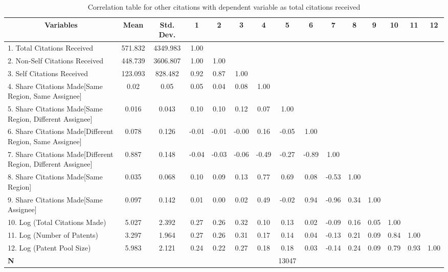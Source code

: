 \begin{table}[htbp]\centering \caption{Correlation table for other citations with dependent variable as total citations received \label{o.tcorrelation}}
\scriptsize
\onehalfspacing
\begin{adjustbox}{angle=90}
\begin{tabular}{l  c  c  c  c  c  c  c  c  c  c  c  c  c  c }\hline\hline
\multicolumn{1}{c}{Variables} & \textbf{Mean}& \textbf{Std. Dev.}&1&2&3&4&5&6&7&8&9&10&11&12\\ \hline
1. Total Citations Received& 571.832 & 4349.983&1.00\\
2. Non-Self Citations Received& 448.739 & 3606.807&1.00&1.00\\
3. Self Citations Received & 123.093 & 828.482&0.92&0.87&1.00\\
4. Share Citations Made[Same Region, Same Assignee] & 0.02 & 0.05&0.05&0.04&0.08&1.00\\
5. Share Citations Made[Same Region, Different Assignee]& 0.016 & 0.043&0.10&0.10&0.12&0.07&1.00\\
6. Share Citations Made[Different Region, Same Assignee]& 0.078 & 0.126&-0.01&-0.01&-0.00&0.16&-0.05&1.00\\
7. Share Citations Made[Different Region, Different Assignee]& 0.887 & 0.148&-0.04&-0.03&-0.06&-0.49&-0.27&-0.89&1.00\\
8. Share Citations Made[Same Region] & 0.035 & 0.068&0.10&0.09&0.13&0.77&0.69&0.08&-0.53&1.00\\
9. Share Citations Made[Same Assignee]& 0.097 & 0.142&0.01&0.00&0.02&0.49&-0.02&0.94&-0.96&0.34&1.00\\
10. Log (Total Citations Made)& 5.027 & 2.392&0.27&0.26&0.32&0.10&0.13&0.02&-0.09&0.16&0.05&1.00\\
11. Log (Number of Patents)& 3.297 & 1.964&0.27&0.26&0.31&0.17&0.14&0.04&-0.13&0.21&0.09&0.84&1.00\\
12. Log (Patent Pool Size)& 5.983 & 2.121&0.24&0.22&0.27&0.18&0.18&0.03&-0.14&0.24&0.09&0.79&0.93&1.00\\
\hline
\textbf{N}&&&&&&&13047\\
\hline \hline 
 \end{tabular}
 \end{adjustbox}
\end{table}

